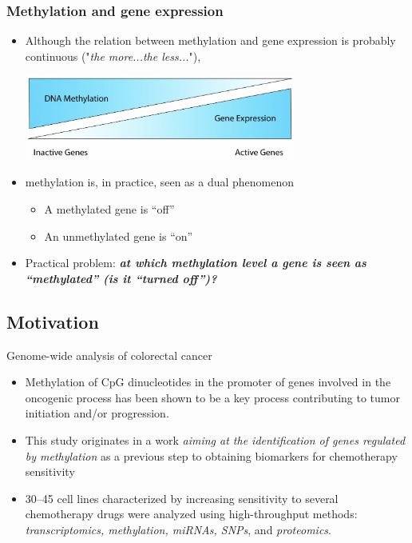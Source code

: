 \documentclass[handout]{beamer}
\begin{document}
\begin{frame}[fragile]\frametitle{Methylation and gene expression}
\begin{itemize}
\item Although the relation between methylation and gene expression is probably continuous ("\emph{the more...the less...}"), 
\begin{center}
\includegraphics[width=0.7\textwidth]{./images/DNA-Methylation-and-Gene-Expression-Relationship.jpg}
\end{center}
\item methylation is, in practice, seen as a dual phenomenon
\begin{itemize}
\item A methylated gene is ``off''
\item An unmethylated gene is ``on''
\end{itemize} 
\item Practical problem: \textbf{\emph{at which methylation level a gene is seen as ``methylated'' (is it ``turned off'')?}}
\end{itemize} 

\end{frame}


\subsection{Motivation}
\begin{frame}{Genome-wide analysis of colorectal cancer}
  \begin{itemize}
  \item Methylation of CpG dinucleotides in the promoter of genes
    involved in the oncogenic process has been shown to be a key
    process contributing to tumor initiation and/or progression.
  \item This study originates in a work \emph{aiming at the identification
    of genes regulated by methylation} as a previous step to obtaining
    biomarkers for chemotherapy sensitivity
  \item 30--45 cell lines characterized by increasing sensitivity to
    several chemotherapy drugs were analyzed using high-throughput
    methods:\emph{ transcriptomics, methylation, miRNAs, SNPs}, and
    \emph{proteomics}.
  \end{itemize}
\end{frame}
\end{document}
